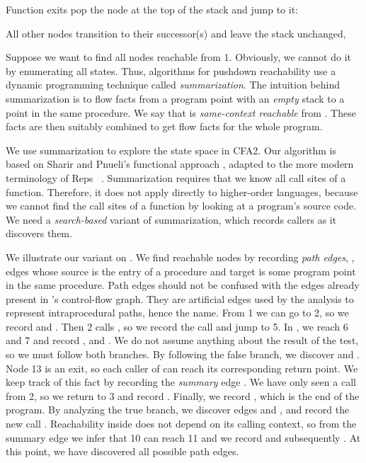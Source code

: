 \documentclass{LMCS}
\theoremstyle{definition} \newtheorem{property}[thm]{Property}
\begin{document}
Function exits pop the node at the top of the stack and jump to it:

All other nodes transition to their successor(s) and leave the stack unchanged,
\eg


Suppose we want to find all nodes reachable from 1.
Obviously, we cannot do it by enumerating all states.
Thus, algorithms for pushdown reachability use a dynamic programming technique
called \emph{summarization}.
The intuition behind summarization is to flow facts from a program point  
with an \emph{empty} stack to a point  in the same procedure.
We say that  is \emph{same-context reachable} from .
These facts are then suitably combined to get flow facts for the whole program.

We use summarization to explore the state space in CFA2.
Our algorithm is based on Sharir and Pnueli's functional approach 
\cite[pg.\ 207]{book/flowanalysis/81/sharir/interproc}, adapted to the more
modern terminology of Reps \etal~\cite{conf/popl/95/reps/interproc}.
Summarization requires that we know all call sites of a function.
Therefore, it does not apply directly to higher-order languages, because we
cannot find the call sites of a function by looking at a program's source code.
We need a \emph{search-based} variant of summarization, which records callers as
it discovers them.

We illustrate our variant on .
We find reachable nodes by recording \emph{path edges}, \ie, edges whose source
is the entry of a procedure and target is some program point in the same 
procedure.
Path edges should not be confused with the edges already present in 's
control-flow graph.
They are artificial edges used by the analysis to represent intraprocedural 
paths, hence the name.
From 1 we can go to 2, so we record  and .
Then 2 calls , so we record the call  and jump to 5.
In , we reach 6 and 7 and record ,  and 
.
We do not assume anything about the result of the test, so we must follow both
branches.
By following the false branch, we discover  and .
Node 13 is an exit, so each caller of  can reach its corresponding 
return point.
We keep track of this fact by recording the \emph{summary} edge .
We have only seen a call from 2, so we return to 3 and record .
Finally, we record , which is the end of the program.
By analyzing the true branch, we discover edges  and ,
and record the new call .
Reachability inside  does not depend on its calling context, so from the
summary edge  we infer that 10 can reach 11 and we record 
 and subsequently .
At this point, we have discovered all possible path edges.
\end{document}

